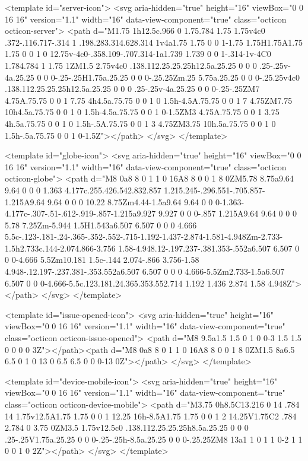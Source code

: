 <template id="server-icon">
  <svg aria-hidden="true" height="16" viewBox="0 0 16 16" version="1.1" width="16" data-view-component="true" class="octicon octicon-server">
    <path d="M1.75 1h12.5c.966 0 1.75.784 1.75 1.75v4c0 .372-.116.717-.314 1 .198.283.314.628.314 1v4a1.75 1.75 0 0 1-1.75 1.75H1.75A1.75 1.75 0 0 1 0 12.75v-4c0-.358.109-.707.314-1a1.739 1.739 0 0 1-.314-1v-4C0 1.784.784 1 1.75 1ZM1.5 2.75v4c0 .138.112.25.25.25h12.5a.25.25 0 0 0 .25-.25v-4a.25.25 0 0 0-.25-.25H1.75a.25.25 0 0 0-.25.25Zm.25 5.75a.25.25 0 0 0-.25.25v4c0 .138.112.25.25.25h12.5a.25.25 0 0 0 .25-.25v-4a.25.25 0 0 0-.25-.25ZM7 4.75A.75.75 0 0 1 7.75 4h4.5a.75.75 0 0 1 0 1.5h-4.5A.75.75 0 0 1 7 4.75ZM7.75 10h4.5a.75.75 0 0 1 0 1.5h-4.5a.75.75 0 0 1 0-1.5ZM3 4.75A.75.75 0 0 1 3.75 4h.5a.75.75 0 0 1 0 1.5h-.5A.75.75 0 0 1 3 4.75ZM3.75 10h.5a.75.75 0 0 1 0 1.5h-.5a.75.75 0 0 1 0-1.5Z"></path>
</svg>
</template>

<template id="globe-icon">
  <svg aria-hidden="true" height="16" viewBox="0 0 16 16" version="1.1" width="16" data-view-component="true" class="octicon octicon-globe">
    <path d="M8 0a8 8 0 1 1 0 16A8 8 0 0 1 8 0ZM5.78 8.75a9.64 9.64 0 0 0 1.363 4.177c.255.426.542.832.857 1.215.245-.296.551-.705.857-1.215A9.64 9.64 0 0 0 10.22 8.75Zm4.44-1.5a9.64 9.64 0 0 0-1.363-4.177c-.307-.51-.612-.919-.857-1.215a9.927 9.927 0 0 0-.857 1.215A9.64 9.64 0 0 0 5.78 7.25Zm-5.944 1.5H1.543a6.507 6.507 0 0 0 4.666 5.5c-.123-.181-.24-.365-.352-.552-.715-1.192-1.437-2.874-1.581-4.948Zm-2.733-1.5h2.733c.144-2.074.866-3.756 1.58-4.948.12-.197.237-.381.353-.552a6.507 6.507 0 0 0-4.666 5.5Zm10.181 1.5c-.144 2.074-.866 3.756-1.58 4.948-.12.197-.237.381-.353.552a6.507 6.507 0 0 0 4.666-5.5Zm2.733-1.5a6.507 6.507 0 0 0-4.666-5.5c.123.181.24.365.353.552.714 1.192 1.436 2.874 1.58 4.948Z"></path>
</svg>
</template>

<template id="issue-opened-icon">
  <svg aria-hidden="true" height="16" viewBox="0 0 16 16" version="1.1" width="16" data-view-component="true" class="octicon octicon-issue-opened">
    <path d="M8 9.5a1.5 1.5 0 1 0 0-3 1.5 1.5 0 0 0 0 3Z"></path><path d="M8 0a8 8 0 1 1 0 16A8 8 0 0 1 8 0ZM1.5 8a6.5 6.5 0 1 0 13 0 6.5 6.5 0 0 0-13 0Z"></path>
</svg>
</template>

<template id="device-mobile-icon">
  <svg aria-hidden="true" height="16" viewBox="0 0 16 16" version="1.1" width="16" data-view-component="true" class="octicon octicon-device-mobile">
    <path d="M3.75 0h8.5C13.216 0 14 .784 14 1.75v12.5A1.75 1.75 0 0 1 12.25 16h-8.5A1.75 1.75 0 0 1 2 14.25V1.75C2 .784 2.784 0 3.75 0ZM3.5 1.75v12.5c0 .138.112.25.25.25h8.5a.25.25 0 0 0 .25-.25V1.75a.25.25 0 0 0-.25-.25h-8.5a.25.25 0 0 0-.25.25ZM8 13a1 1 0 1 1 0-2 1 1 0 0 1 0 2Z"></path>
</svg>
</template>

